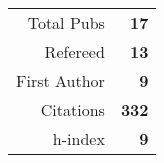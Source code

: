 \begin{table}\begin{tabular}{rr}Total Pubs & \textbf{17}\\Refereed & \textbf{13}\\First Author & \textbf{9}\\Citations & \quad \textbf{332}\\h-index & \textbf{9}\end{tabular}\end{table}